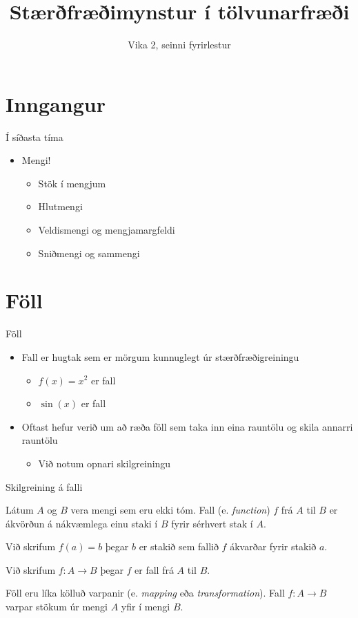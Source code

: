\documentclass[handout]{beamer}
\title{Stærðfræðimynstur í tölvunarfræði}
\subtitle{Vika 2, seinni fyrirlestur}
\begin{document}
\begin{frame}
\titlepage
\end{frame}

\section{Inngangur}

\begin{frame}{Í síðasta tíma}
\begin{itemize}
 \item Mengi!
 \begin{itemize}
  \item Stök í mengjum
  \item Hlutmengi
  \item Veldismengi og mengjamargfeldi
  \item Sniðmengi og sammengi
 \end{itemize}
\end{itemize}
\end{frame}

\section{Föll}

\begin{frame}{Föll}
\begin{itemize}
 \item Fall er hugtak sem er mörgum kunnuglegt úr stærðfræðigreiningu
 \begin{itemize}
  \item $f(x) = x^2$ er fall
  \item $\sin(x)$ er fall
 \end{itemize}
 \item Oftast hefur verið um að ræða föll sem taka inn eina rauntölu og skila annarri rauntölu
 \begin{itemize}
  \item Við notum opnari skilgreiningu
 \end{itemize}
\end{itemize}
\end{frame}

\begin{frame}{Skilgreining á falli}
\begin{tcolorbox}[title=Fall]
Látum $A$ og $B$ vera mengi sem eru ekki tóm. Fall (e. \emph{function}) $f$ frá $A$ til $B$ er ákvörðun á nákvæmlega einu staki í $B$ fyrir sérhvert stak í $A$.

Við skrifum $f(a) = b$ þegar $b$ er stakið sem fallið $f$ ákvarðar fyrir stakið $a$.

Við skrifum $f: A \to B$ þegar $f$ er fall frá $A$ til $B$.
\end{tcolorbox}

Föll eru líka kölluð varpanir (e. \emph{mapping} eða \emph{transformation}). Fall $f: A \to B$ varpar stökum úr mengi $A$ yfir í mengi $B$.
\end{frame}
\end{document}
